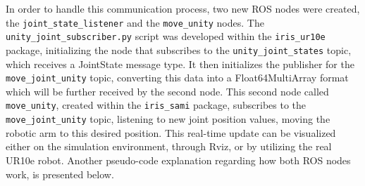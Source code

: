     
    In order to handle this communication process, two new \ac{ROS} nodes were created, the \texttt{joint\_state\_listener} and the \texttt{move\_unity} nodes. The \texttt{unity\_joint\_subscriber.py} script was developed within the \texttt{iris\_ur10e} package, initializing the node that subscribes to the \texttt{unity\_joint\_states} topic, which receives a JointState message type. It then initializes the publisher for the \texttt{move\_joint\_unity} topic, converting this data into a Float64MultiArray format which will be further received by the second node. This second node called \texttt{move\_unity}, created within the \texttt{iris\_sami} package, subscribes to the \texttt{move\_joint\_unity} topic, listening to new joint position values, moving the robotic arm to this desired position. This real-time update can be visualized either on the simulation environment, through Rviz, or by utilizing the real UR10e robot. Another pseudo-code explanation regarding how both \ac{ROS} nodes work, is presented below.

    
    


